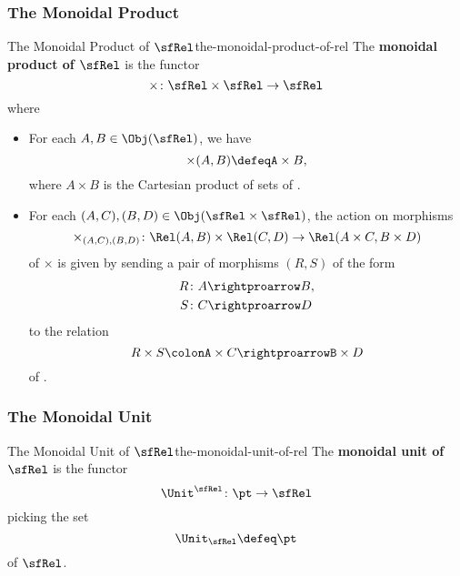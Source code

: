 \subsubsection{The Monoidal Product}\label{subsubsection-the-closed-symmetric-monoidal-category-of-relations-the-monoidal-product}
\begin{definition}{The Monoidal Product of $\sfRel$}{the-monoidal-product-of-rel}%
    The \textbf{monoidal product of $\sfRel$} is the functor
    \[
        \times%
        \colon%
        \sfRel\times\sfRel%
        \to%
        \sfRel%
    \]%
    where
    \begin{itemize}
        \item{}For each $A,B\in\Obj(\sfRel)$, we have%
            \[%
                \mathord{\times}(A,B)%
                \defeq%
                A\times B,%
            \]%
            where $A\times B$ is the Cartesian product of sets of .
        \item{}For each $(A,C),(B,D)\in\Obj(\sfRel\times\sfRel)$, the action on morphisms
            \[
                \times_{(A,C),(B,D)}%
                \colon%
                \Rel(A,B)\times\Rel(C,D)%
                \to%
                \Rel(A\times C,B\times D)%
            \]%
            of $\times$ is given by sending a pair of morphisms $(R,S)$ of the form
            \begin{align*}
                R &\colon A\rightproarrow B,\\
                S &\colon C\rightproarrow D
            \end{align*}
            to the relation
            \[
                R\times S%
                \colon%
                A\times C%
                \rightproarrow%
                B\times D%
            \]%
            of .
    \end{itemize}
\end{definition}
\subsubsection{The Monoidal Unit}\label{subsubsection-the-closed-symmetric-monoidal-category-of-relations-the-monoidal-unit}
\begin{definition}{The Monoidal Unit of $\sfRel$}{the-monoidal-unit-of-rel}%
    The \textbf{monoidal unit of $\sfRel$} is the functor
    \[
        \Unit^{\sfRel}%
        \colon%
        \pt%
        \to%
        \sfRel%
    \]%
    picking the set
    \[
        \Unit_{\sfRel}%
        \defeq%
        \pt%
    \]%
    of $\sfRel$.
\end{definition}
